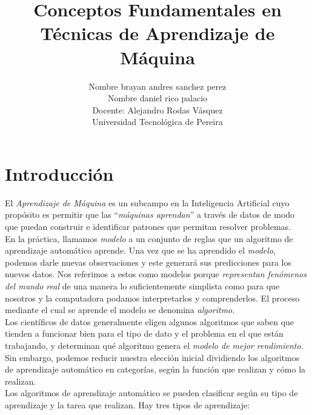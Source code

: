 \documentclass[12pt]{article}
\begin{document}
 
 
\title{Conceptos Fundamentales en Técnicas de Aprendizaje de Máquina}
\author{Nombre brayan andres sanchez perez\\
Nombre daniel rico palacio \\
Docente: Alejandro Rodas Vásquez\\
Universidad Tecnológica de Pereira}

\maketitle



\section*{Introducción}
El \textit{Aprendizaje de Máquina} es un subcampo en la Inteligencia Artificial cuyo propósito es permitir que las ``\textit{máquinas aprendan}'' a través de datos de modo que puedan construir e identificar patrones que permitan resolver problemas.\\

En la práctica, llamamos \textit{modelo} a un conjunto de reglas que un algoritmo de aprendizaje automático aprende. Una vez que se ha aprendido el \textit{modelo}, podemos darle nuevas observaciones y este generará sus predicciones para los nuevos datos. Nos referimos a estos como modelos porque \textit{representan fenómenos del mundo real} de una manera lo suficientemente simplista como para que nosotros y la computadora podamos interpretarlos y comprenderlos. El proceso mediante el cual se aprende el modelo se denomina \textit{algoritmo}.\\

Los científicos de datos generalmente eligen algunos algoritmos que saben que tienden a funcionar bien para el tipo de dato y el problema en el que están trabajando, y determinan qué algoritmo genera el \textit{modelo de mejor rendimiento}. Sin embargo, podemos reducir nuestra elección inicial dividiendo los algoritmos de aprendizaje automático en categorías, según la función que realizan y cómo la realizan.\\

Los algoritmos de aprendizaje automático se pueden clasificar según su tipo de aprendizaje y la tarea que realizan. Hay tres tipos de aprendizaje:
\end{document}
